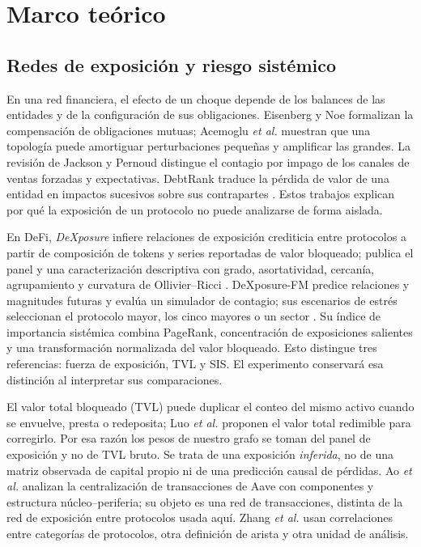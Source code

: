 \documentclass[journal]{IEEEtran}
\begin{document}
\section{Marco teórico}

\subsection{Redes de exposición y riesgo sistémico}

En una red financiera, el efecto de un choque depende de los balances de las
entidades y de la configuración de sus obligaciones. Eisenberg y Noe
\cite{eisenberg2001systemic} formalizan la compensación de obligaciones mutuas;
Acemoglu \emph{et al.} \cite{acemoglu2015systemic} muestran que una topología
puede amortiguar perturbaciones pequeñas y amplificar las grandes. La revisión
de Jackson y Pernoud \cite{jackson2020survey} distingue el contagio por impago
de los canales de ventas forzadas y expectativas. DebtRank traduce la pérdida
de valor de una entidad en impactos sucesivos sobre sus contrapartes
\cite{battiston2012debtrank,bardoscia2015debtrank}. Estos trabajos explican por
qué la exposición de un protocolo no puede analizarse de forma aislada.

En DeFi, \emph{DeXposure} infiere relaciones de exposición crediticia entre
protocolos a partir de composición de tokens y series reportadas de valor
bloqueado; publica el panel y una caracterización descriptiva con grado,
asortatividad, cercanía, agrupamiento y curvatura de Ollivier--Ricci
\cite{wu2025dexposure}. DeXposure-FM predice relaciones y magnitudes futuras y
evalúa un simulador de contagio; sus escenarios de estrés seleccionan el
protocolo mayor, los cinco mayores o un sector \cite{shu2026dexposurefm}. Su
índice de importancia sistémica combina PageRank, concentración de exposiciones
salientes y una transformación normalizada del valor bloqueado. Esto distingue
tres referencias: fuerza de exposición, TVL y SIS. El experimento conservará
esa distinción al interpretar sus comparaciones.

El valor total bloqueado (TVL) puede duplicar el conteo del mismo activo cuando
se envuelve, presta o redeposita; Luo \emph{et al.} \cite{luo2024piercing}
proponen el valor total redimible para corregirlo. Por esa razón los pesos de
nuestro grafo se toman del panel de exposición y no de TVL bruto. Se trata de
una exposición \emph{inferida}, no de una matriz observada de capital propio ni
de una predicción causal de pérdidas. Ao \emph{et al.} \cite{ao2022isdefi}
analizan la centralización de transacciones de Aave con componentes y
estructura núcleo--periferia; su objeto es una red de transacciones, distinta
de la red de exposición entre protocolos usada aquí. Zhang \emph{et al.}
\cite{zhang2026systemicdefi} usan correlaciones entre categorías de protocolos,
otra definición de arista y otra unidad de análisis.
\end{document}
